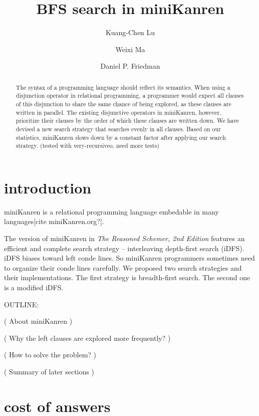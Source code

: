 \documentclass[format=acmlarge, review=true, authordraft=true]{acmart}
\title{BFS search in miniKanren}
\author{Kuang-Chen Lu}
\affiliation{Indiana University}
\author{Weixi Ma}
\affiliation{Indiana University}
\author{Daniel P. Friedman}
\affiliation{Indiana University}
\begin{document}
\begin{abstract}

The syntax of a programming language should reflect its semantics.
When using a disjunction operator in relational programming, a programmer would
expect all clauses of this disjunction to share the same chance of being explored,
as these clauses are written in parallel. The existing disjunctive operators in miniKanren,
however, prioritize their clauses by the order of which these clauses are written down.
We have devised a new search strategy that searches evenly in all clauses.
Based on our statistics, miniKanren slows down by a constant factor after applying our search strategy.
(tested with very-recursiveo, need more tests)


\end{abstract}

\maketitle

\section{introduction}

miniKanren is a relational programming language embedable in many languages[cite
miniKanren.org?]. 

The version of miniKanren in \textit{The Reasoned Schemer, 2nd Edition} features
an efficient and complete search strategy -- interleaving depth-first search (iDFS).
iDFS biases toward left conde lines. So miniKanren programmers sometimes need to
organize their conde lines carefully. We proposed two search strategies and their
implementations. The first strategy is breadth-first search. The second one is a
modified iDFS.

OUTLINE:

( About miniKanren )

( Why the left clauses are explored more frequently? )


( How to solve the problem? )

( Summary of later sections )

\section{cost of answers}

\end{document}
